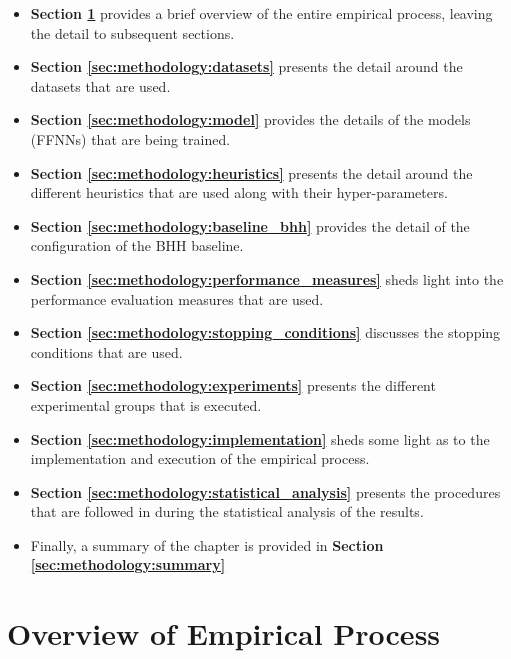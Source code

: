 \begin{itemize}
    \item \textbf{Section \ref{sec:methodology:overview}} provides a brief overview of the entire empirical process, leaving the detail to subsequent sections.

    \item \textbf{Section \ref{sec:methodology:datasets}} presents the detail around the datasets that are used.
    
    \item \textbf{Section \ref{sec:methodology:model}} provides the details of the models (\acs{FFNN}s) that are being trained.
    
    \item \textbf{Section \ref{sec:methodology:heuristics}} presents the detail around the different heuristics that are used along with their hyper-parameters.
    
    \item \textbf{Section \ref{sec:methodology:baseline_bhh}} provides the detail of the configuration of the \acs{BHH} baseline.
    
    \item \textbf{Section \ref{sec:methodology:performance_measures}} sheds light into the performance evaluation measures that are used.
    
    \item \textbf{Section \ref{sec:methodology:stopping_conditions}} discusses the stopping conditions that are used.
    
    \item \textbf{Section \ref{sec:methodology:experiments}} presents the different experimental groups that is executed.

    \item \textbf{Section \ref{sec:methodology:implementation}} sheds some light as to the implementation and execution of the empirical process.
    
    \item \textbf{Section \ref{sec:methodology:statistical_analysis}} presents the procedures that are followed in during the statistical analysis of the results.
    
    \item Finally, a summary of the chapter is provided in \textbf{Section \ref{sec:methodology:summary}}
\end{itemize}

\section{Overview of Empirical Process}
\label{sec:methodology:overview}

